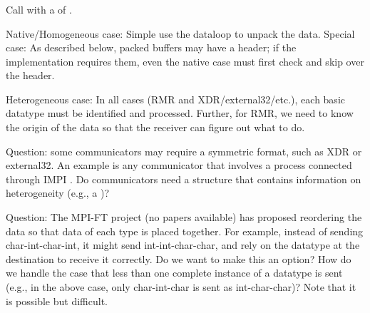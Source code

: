 \documentclass{article}
\begin{document}
\subsubsection{}
\label{sec:mpi-unpack}
Call  with a  of .

\begin{adi3}
Native/Homogeneous case: Simple use the dataloop to unpack the data.
Special case: As described below, packed buffers may have a header; if the
implementation requires them, even the native case must first check and skip
over the header.

Heterogeneous case:  In all cases (RMR and XDR/external32/etc.), each basic
datatype must be identified and processed.  Further, for RMR, we need to know
the origin of the data so that the receiver can figure out what to do.

Question: some communicators may require a symmetric format, such as XDR or
external32.  An example is any communicator that involves a process connected
through IMPI \cite{impi}.  Do communicators need a structure that contains
information on heterogeneity (e.g., a )?

Question:  The MPI-FT project (no papers available) has proposed reordering
the data so that data of each type is placed together.  For example, instead
of sending char-int-char-int, it might send int-int-char-char, and rely on the
datatype at the destination to receive it correctly.  Do we want to make this
an option?  How do we handle the case that less than one complete instance of
a datatype is sent (e.g., in the above case, only char-int-char is sent as
int-char-char)?  Note that it is possible but difficult.
\end{adi3}
\end{document}
